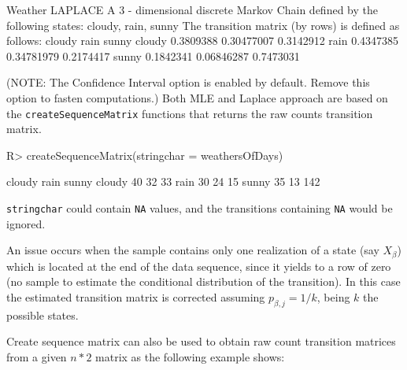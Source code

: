 \documentclass[
  nojss]{jss}
\begin{document}
\begin{CodeChunk}


\begin{CodeOutput}
Weather LAPLACE 
 A  3 - dimensional discrete Markov Chain defined by the following states: 
 cloudy, rain, sunny 
 The transition matrix  (by rows)  is defined as follows: 
          cloudy       rain     sunny
cloudy 0.3809388 0.30477007 0.3142912
rain   0.4347385 0.34781979 0.2174417
sunny  0.1842341 0.06846287 0.7473031
\end{CodeOutput}
\end{CodeChunk}

(NOTE: The Confidence Interval option is enabled by default. Remove this option to fasten computations.) Both MLE and Laplace approach are based on the \texttt{createSequenceMatrix} functions that returns the raw counts transition matrix.

\begin{CodeChunk}

\begin{CodeInput}
R> createSequenceMatrix(stringchar = weathersOfDays)
\end{CodeInput}

\begin{CodeOutput}
       cloudy rain sunny
cloudy     40   32    33
rain       30   24    15
sunny      35   13   142
\end{CodeOutput}
\end{CodeChunk}

\texttt{stringchar} could contain \texttt{NA} values, and the transitions containing \texttt{NA} would be ignored.

An issue occurs when the sample contains only one realization of a state (say \(X_{\beta}\)) which is located at the end of the data sequence, since it yields to a row of zero (no sample to estimate the conditional distribution of the transition). In this case the estimated transition matrix is corrected assuming \(p_{\beta,j}=1/k\), being \(k\) the possible states.

Create sequence matrix can also be used to obtain raw count transition matrices from a given \(n*2\) matrix as the following example shows:
\end{document}
